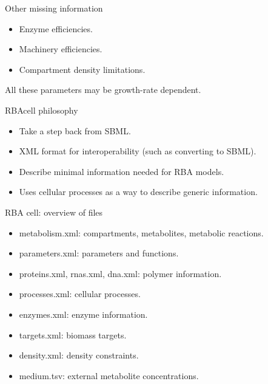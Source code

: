 \documentclass{beamer}
\begin{document}
\begin{frame}{Other missing information}
  \begin{itemize}
    \item Enzyme efficiencies.
    \item Machinery efficiencies.
    \item Compartment density limitations.
  \end{itemize}
  All these parameters may be growth-rate dependent.
\end{frame}

\begin{frame}{RBAcell philosophy}
  \begin{itemize}
    \item Take a step back from SBML.
    \item XML format for interoperability (such as converting to SBML).
    \item Describe minimal information needed for RBA models.
    \item Uses cellular processes as a way to describe generic information.
  \end{itemize}
\end{frame}

\begin{frame}{RBA cell: overview of files}
  \begin{itemize}
    \item metabolism.xml: compartments, metabolites, metabolic reactions.
    \item parameters.xml: parameters and functions.
    \item proteins.xml, rnas.xml, dna.xml: polymer information.
    \item processes.xml: cellular processes.
    \item enzymes.xml: enzyme information.
    \item targets.xml: biomass targets.
    \item density.xml: density constraints.
    \item medium.tsv: external metabolite concentrations.
  \end{itemize}
\end{frame}
\end{document}

